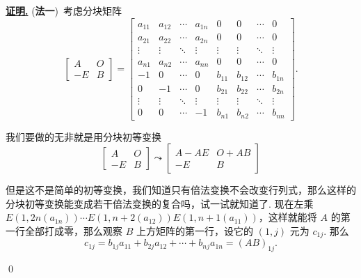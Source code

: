 \documentclass[10pt,openany]{article}
\theoremstyle{thmstyle} %
\theoremstyle{defstyle} %
\theoremstyle{prostyle} %
\theoremstyle{exastyle}
\theoremstyle{remstyle}
\renewenvironment{proof}[1][证明]{\par\underline{\textbf{#1.}} \;\fangsong}{\qed\par}
\begin{document}
\begin{proof}
	(\textbf{法一})\ 考虑分块矩阵
	\[  \begin{bmatrix}
		A & O \\
		-E & B
	\end{bmatrix}=\begin{bmatrix}
	a_{11} & a_{12} & \cdots & a_{1n} & 0 & 0 & \cdots & 0 \\
	a_{21} & a_{22} & \cdots & a_{2n} & 0 & 0 & \cdots & 0 \\
	\vdots & \vdots & \ddots & \vdots & \vdots & \vdots & \ddots & \vdots \\
	a_{n1} & a_{n2} & \cdots & a_{nn} & 0 & 0 & \cdots & 0 \\
	-1 & 0 & \cdots & 0  & b_{11} & b_{12} & \cdots & b_{1n} \\
    0 & -1 & \cdots & 0  & b_{21} & b_{22} & \cdots & b_{2n} \\
	\vdots & \vdots & \ddots & \vdots & \vdots & \vdots & \ddots & \vdots \\
	0 & 0 & \cdots & -1 & b_{n1} & b_{n2} & \cdots & b_{nn} 
	\end{bmatrix}. \]
	
	我们要做的无非就是用分块初等变换
	\[ \begin{bmatrix}
		A & O \\
		-E & B
	\end{bmatrix} \leadsto \begin{bmatrix}
	A-AE & O+AB \\
	-E & B
	\end{bmatrix} \]
	
	但是这不是简单的初等变换，我们知道只有倍法变换不会改变行列式，那么这样的分块初等变换能变成若干倍法变换的复合吗，试一试就知道了. 现在左乘 \( E(1,2n(a_{1n}))\cdots E(1,n+2(a_{12}))E(1,n+1(a_{11})) \)，这样就能将 \( A \) 的第一行全部打成零，那么观察 \( B \) 上方矩阵的第一行，设它的 \( (1,j) \) 元为 \( c_{1j} \). 那么
	\[ c_{1j}= b_{1j}a_{11}+b_{2j}a_{12}+\cdots+b_{nj}a_{1n}=(AB)_{1j}. \]
	

\end{proof}
\end{document}
